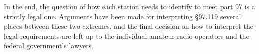 In the end, the question of how each station needs to identify to meet part 97 is a
strictly legal one. Arguments have been made for interpreting \S97.119 
several places between these two extremes, and the final decision on how to interpret
the legal requirements are left up to the individual amateur radio operators and the
federal government's lawyers.

